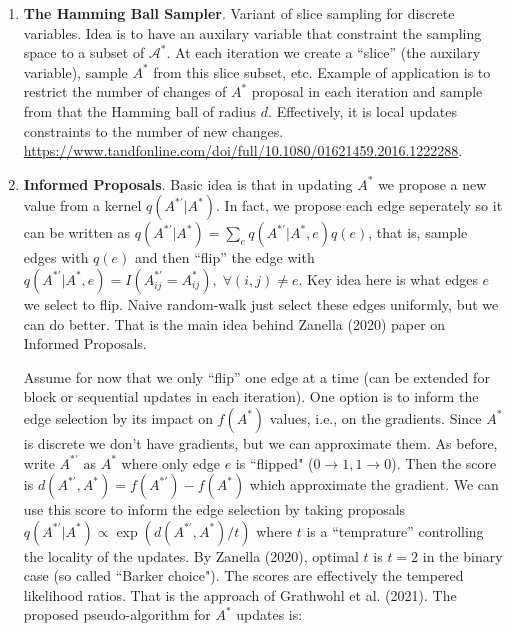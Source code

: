 \documentclass[12pt]{article}
\begin{document}
\begin{enumerate}
    \item \textbf{The Hamming Ball Sampler}. Variant of slice sampling for discrete variables.
            Idea is to have an auxilary variable that constraint the sampling space 
            to a subset of $\mathcal{A}^\ast$. At each iteration we create a ``slice'' 
            (the auxilary variable), sample $A^\ast$ from this slice subset, etc.
            Example of application is to restrict the number of changes of $A^\ast$
            proposal in each iteration and sample from that the Hamming ball of radius $d$.
            Effectively, it is local updates constraints to the number of new changes.
            \url{https://www.tandfonline.com/doi/full/10.1080/01621459.2016.1222288}. 

    \item \textbf{Informed Proposals}. Basic idea is that in updating $A^\ast$ 
            we propose a new value from a kernel $q(A^{\ast'} \vert A^\ast)$. 
            In fact, we propose each edge seperately so it can be written as 
            $q(A^{\ast'} \vert A^\ast) = \sum_{e} q(A^{\ast'} \vert A^\ast,e)q(e)$, that is, 
            sample edges with $q(e)$ and then ``flip'' the edge with 
            $q(A^{\ast'} \vert A^\ast,e) = I(A^{\ast'}_{ij}=A^\ast_{ij}), \; \forall (i,j)\neq e$.
            Key idea here is what edges $e$ we select to flip. 
            Naive random-walk just select these edges uniformly, but we can do better.
            That is the main idea behind Zanella (2020) paper on Informed Proposals.
             
            Assume for now that we only ``flip'' one edge at a time 
            (can be extended for block or sequential updates in each iteration).
            One option is to inform the edge selection by its impact on $f(A^\ast)$ values,
            i.e., on the gradients. Since $A^\ast$ is discrete we don't have gradients,
            but we can approximate them.
            As before, write $A^{\ast'}$ as $A^\ast$ where only edge $e$ is ``flipped" ($0\to 1, 1\to 0$).
            Then the score is $d(A^{\ast'},A^\ast) = f(A^{\ast'}) - f(A^\ast)$ which approximate the gradient.
            We can use this score to inform the edge selection by taking proposals 
            $q(A^{\ast'} \vert A^\ast) \propto \exp(d(A^{\ast'},A^\ast)/t)$ where $t$ is a 
            ``temprature'' controlling the locality of the updates. 
            By Zanella (2020), optimal $t$ is $t=2$ in the binary case (so called ``Barker choice").
            The scores are 
            effectively the tempered likelihood ratios. That is the approach of 
            Grathwohl et al. (2021). The proposed pseudo-algorithm for $A^\ast$ updates is:


\end{enumerate}
\end{document}
